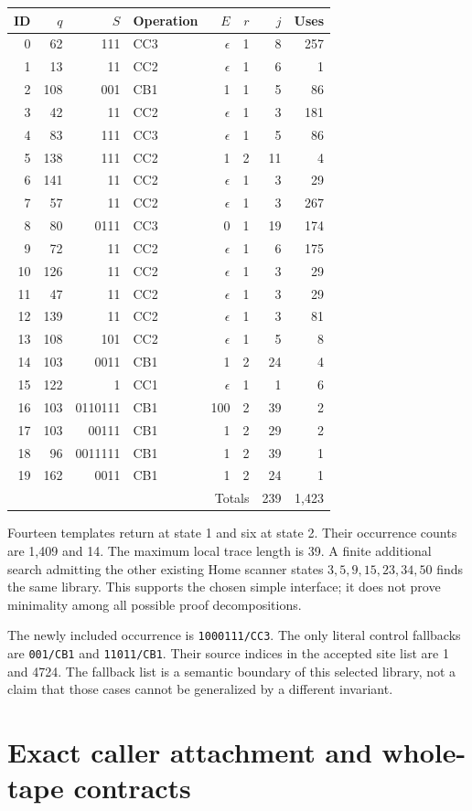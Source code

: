 \documentclass[11pt]{article}
\theoremstyle{definition}\newtheorem{definition}[theorem]{Definition}
\theoremstyle{remark}\newtheorem{remark}[theorem]{Remark}
\newcommand{\code}[1]{\nolinkurl{#1}}
\begin{document}
\begin{longtable}{rrrlrrrr}
\toprule
ID & $q$ & $S$ & Operation & $E$ & $r$ & $j$ & Uses\\
\midrule\endhead
0&62&111&CC3&$\epsilon$&1&8&257\\
1&13&11&CC2&$\epsilon$&1&6&1\\
2&108&001&CB1&1&1&5&86\\
3&42&11&CC2&$\epsilon$&1&3&181\\
4&83&111&CC3&$\epsilon$&1&5&86\\
5&138&111&CC2&1&2&11&4\\
6&141&11&CC2&$\epsilon$&1&3&29\\
7&57&11&CC2&$\epsilon$&1&3&267\\
8&80&0111&CC3&0&1&19&174\\
9&72&11&CC2&$\epsilon$&1&6&175\\
10&126&11&CC2&$\epsilon$&1&3&29\\
11&47&11&CC2&$\epsilon$&1&3&29\\
12&139&11&CC2&$\epsilon$&1&3&81\\
13&108&101&CC2&$\epsilon$&1&5&8\\
14&103&0011&CB1&1&2&24&4\\
15&122&1&CC1&$\epsilon$&1&1&6\\
16&103&0110111&CB1&100&2&39&2\\
17&103&00111&CB1&1&2&29&2\\
18&96&0011111&CB1&1&2&39&1\\
19&162&0011&CB1&1&2&24&1\\
\midrule
\multicolumn{6}{r}{Totals}&239&1,423\\
\bottomrule
\end{longtable}

Fourteen templates return at state 1 and six at state 2. Their occurrence counts are 1,409 and 14. The maximum local trace length is 39. A finite additional search admitting the other existing Home scanner states $3,5,9,15,23,34,50$ finds the same library. This supports the chosen simple interface; it does not prove minimality among all possible proof decompositions.

The newly included occurrence is \code{1000111/CC3}. The only literal control fallbacks are \code{001/CB1} and \code{11011/CB1}. Their source indices in the accepted site list are 1 and 4724. The fallback list is a semantic boundary of this selected library, not a claim that those cases cannot be generalized by a different invariant.

\section{Exact caller attachment and whole-tape contracts}
\end{document}
